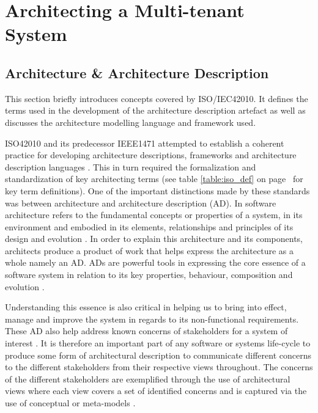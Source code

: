\chapter{Architecting a Multi-tenant System}
\label{chapter:architecting}
\section{Architecture \& Architecture Description} 
This section briefly introduces concepts covered by ISO/IEC42010. It defines the terms used in the development of the architecture description artefact as well as discusses the architecture modelling language and framework used.


ISO42010 and its predecessor IEEE1471 attempted to establish a coherent practice for developing architecture descriptions, frameworks and architecture description languages \cite{InternationalOrganizationOfStandardization2011}. This in turn required the formalization and standardization of key architecting terms (see table \ref{table:iso_def} on page~\pageref{table:iso_def} for key term definitions). One of the important distinctions made by these standards was between architecture and architecture description (AD). In software architecture refers to the fundamental concepts or properties of a system, in its environment and embodied in its elements, relationships and principles of its design and evolution \cite{InternationalOrganizationOfStandardization2011}. In order to explain this architecture and its components, architects produce a product of work that helps express the architecture as a whole namely an AD. ADs are powerful tools in expressing the core essence of a software system in relation to its key properties, behaviour, composition and evolution \cite{InternationalOrganizationOfStandardization2011}. 

Understanding this essence is also critical in helping us to bring into effect, manage and improve the system in regards to its non-functional requirements. These AD also help address known concerns of stakeholders for a system of interest \cite{Emery2009}. It is therefore an important part of any software or systems life-cycle to produce some form of architectural description to communicate different concerns to the different stakeholders from their respective views throughout. The concerns of the different stakeholders are exemplified through the use of architectural views where each view covers a set of identified concerns and is captured via the use of conceptual or meta-models \cite{42010faq}.


